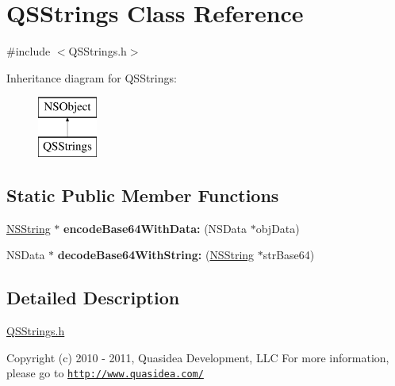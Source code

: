 \hypertarget{interface_q_s_strings}{
\section{\-Q\-S\-Strings \-Class \-Reference}
\label{interface_q_s_strings}
}


{\ttfamily \#include $<$\-Q\-S\-Strings.\-h$>$}

\-Inheritance diagram for \-Q\-S\-Strings\-:\begin{figure}[H]
\begin{center}
\leavevmode
\includegraphics[height=2.000000cm]{interface_q_s_strings}
\end{center}
\end{figure}
\subsection*{\-Static \-Public \-Member \-Functions}
\begin{DoxyCompactItemize}
\item 
\hypertarget{interface_q_s_strings_a25253710a89549a1859331b71756b74f}{
\hyperlink{class_n_s_string}{\-N\-S\-String} $\ast$ {\bfseries encode\-Base64\-With\-Data\-:} (\-N\-S\-Data $\ast$obj\-Data)}
\label{interface_q_s_strings_a25253710a89549a1859331b71756b74f}

\item 
\hypertarget{interface_q_s_strings_a52b5b5d62c7fb5059a7c21693d29b500}{
\-N\-S\-Data $\ast$ {\bfseries decode\-Base64\-With\-String\-:} (\hyperlink{class_n_s_string}{\-N\-S\-String} $\ast$str\-Base64)}
\label{interface_q_s_strings_a52b5b5d62c7fb5059a7c21693d29b500}

\end{DoxyCompactItemize}


\subsection{\-Detailed \-Description}
\hyperlink{_q_s_strings_8h_source}{\-Q\-S\-Strings.\-h}

\-Copyright (c) 2010 -\/ 2011, \-Quasidea \-Development, \-L\-L\-C \-For more information, please go to \href{http://www.quasidea.com/}{\tt http\-://www.\-quasidea.\-com/}

